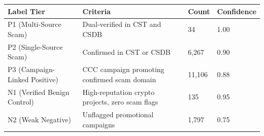 \begin{tabular}{llll}
\toprule
Label Tier & Criteria & Count & Confidence \\
\midrule
P1 (Multi-Source Scam) & Dual-verified in CST and CSDB & 34 & 1.00 \\
P2 (Single-Source Scam) & Confirmed in CST or CSDB & 6,267 & 0.90 \\
P3 (Campaign-Linked Positive) & CCC campaign promoting confirmed scam domain & 11,106 & 0.88 \\
N1 (Verified Benign Control) & High-reputation crypto projects, zero scam flags & 135 & 0.95 \\
N2 (Weak Negative) & Unflagged promotional campaigns & 1,797 & 0.75 \\
\bottomrule
\end{tabular}
